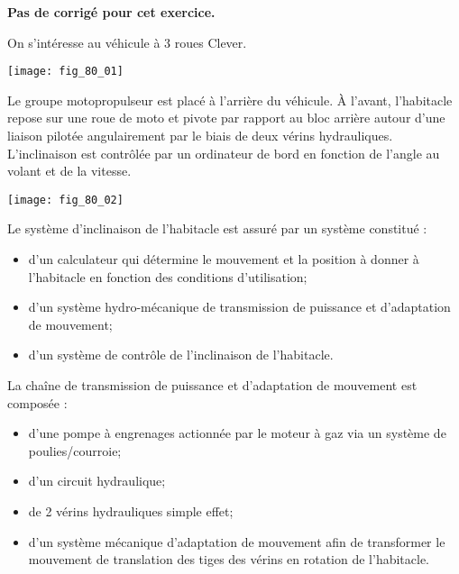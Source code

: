 \normaltrue \difficilefalse \tdifficilefalse
\correctionfalse

\setcounter{numques}{0}
\ifcorrection
\else
\textbf{Pas de corrigé pour cet exercice.}
\fi




On s'intéresse au véhicule à 3 roues Clever.

\ifprof
\else
\begin{marginfigure}
\texttt{[image: fig\_80\_01]}
\end{marginfigure}


 Le groupe motopropulseur est placé à l'arrière du véhicule. À l’avant, l’habitacle repose sur une roue de moto et pivote par rapport au bloc arrière autour d’une liaison pilotée angulairement par le biais de deux vérins hydrauliques. L'inclinaison est contrôlée par un ordinateur de bord en fonction de l'angle au volant et de la vitesse. 

\begin{center}
\texttt{[image: fig\_80\_02]}
\end{center}

Le système d’inclinaison de l’habitacle est assuré par un système constitué :
\begin{itemize}
\item d’un calculateur qui détermine le mouvement et la position à donner à l’habitacle en fonction des conditions
d’utilisation;
\item d’un système hydro-mécanique de transmission de puissance et d’adaptation de mouvement;
\item d’un système de contrôle de l’inclinaison de l’habitacle.
\end{itemize}

La chaîne de transmission de puissance et d’adaptation de mouvement est composée :
\begin{itemize}
\item d’une pompe à engrenages actionnée par le moteur à gaz via un système de poulies/courroie;
\item d’un circuit hydraulique;
\item de 2 vérins hydrauliques simple effet;
\item d’un système mécanique d’adaptation de mouvement afin de transformer le mouvement de translation des tiges des vérins en rotation de l’habitacle.
\end{itemize}


